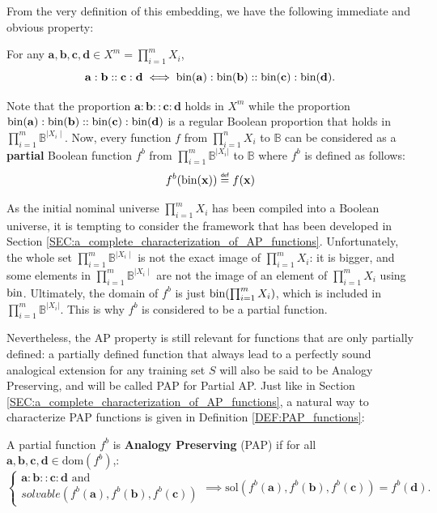 From the very definition of this embedding, we have the following immediate and
obvious property:
\begin{property}
  \label{PROPER:analogy_nominal_iff_analogy_bin}
  For any $\mathbf{a}, \mathbf{b}, \mathbf{c}, \mathbf{d} \in X^m =
  \prod_{i=1}^m X_i$,
$$\mathbf{a}: \mathbf{b}:: \mathbf{c}: \mathbf{d} \iff
 \text{bin}(\mathbf{a}): \text{bin}(\mathbf{b}):: \text{bin}(\mathbf{c}):
  \text{bin}(\mathbf{d}).$$
 \end{property}
 \noindent
 Note that the proportion $\mathbf{a}: \mathbf{b}:: \mathbf{c}: \mathbf{d}$
 holds in $X^m$ while the proportion $\text{bin}(\mathbf{a}): \text{bin}(\mathbf{b})::
 \text{bin}(\mathbf{c}): \text{bin}(\mathbf{d})$ is a regular Boolean proportion that holds
 in $\prod_{i=1}^m\mathbb{B}^{\mid X_i \mid}$.  Now, every function $f$ from
 $\prod_{i=1}^n X_i$ to $\mathbb{B}$ can be considered as a \textbf{partial}
 Boolean function $f^b$ from $\prod_{i=1}^m \mathbb{B}^{|X_i|}$ to $\mathbb{B}$
 where $f^b$ is defined as follows:
$$
f^b(\bin(\mathbf{x})) \eqdef f(\mathbf{x})
$$

As the initial nominal universe  $\prod_{i=1}^m X_i$  has been compiled into a
Boolean universe, it is tempting to consider the framework that has been
developed in Section \ref{SEC:a_complete_characterization_of_AP_functions}.
Unfortunately, the whole set $\prod_{i=1}^m \mathbb{B}^{\mid X_i\mid}$ is not
the exact image of $\prod_{i=1}^m X_i$: it is bigger, and some elements in
$\prod_{i=1}^m  \mathbb{B}^{\mid X_i\mid}$ are not the image of an element of
$\prod_{i=1}^m X_i$ using $\text{bin}$.  Ultimately, the domain of $f^b$ is just
$\text{bin}(\prod_{i=1}^m X_i)$, which is included in $\prod_{i=1}^m
\mathbb{B}^{|X_i|}$. This is why $f^b$ is considered to be a partial function.

Nevertheless, the AP property is still relevant for functions that are only
partially defined: a partially defined function that always lead to a perfectly
sound analogical extension for any training set $S$ will also be said to be
Analogy Preserving, and will be called PAP for Partial AP. Just like in Section
\ref{SEC:a_complete_characterization_of_AP_functions}, a natural way to
characterize PAP functions is given in Definition \ref{DEF:PAP_functions}:

\begin{definition}
  \label{DEF:PAP_functions}
  A partial function $f^b$ is {\bf Analogy Preserving} (PAP)
  if for all $\mathbf{a}, \mathbf{b}, \mathbf{c}, \mathbf{d} \in
  \text{dom}(f^b)$,:
  $$
  \begin{cases}
    \mathbf{a} :  \mathbf{b} ::  \mathbf{c} :  \mathbf{d} \text{ and }\\
    solvable(f^b(\mathbf{a}),f^b(\mathbf{b}),f^b(\mathbf{c}))
  \end{cases}
  \implies \text{sol}(f^b(\mathbf{a}),f^b(\mathbf{b}),f^b(\mathbf{c})) =
  f^b(\mathbf{d}).
  $$
\end{definition}

